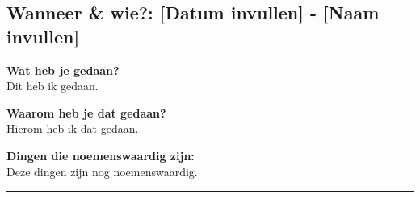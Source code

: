 
\subsection*{Wanneer \& wie?: [Datum invullen] - [Naam invullen]}

\textbf{Wat heb je gedaan?}\\
Dit heb ik gedaan.
\vspace{0.3cm} 

\noindent \textbf{Waarom heb je dat gedaan?}\\
Hierom heb ik dat gedaan.

\noindent \textbf{Dingen die noemenswaardig zijn:}\\
Deze dingen zijn nog noemenswaardig.


\vspace{0.5cm}
\hrule 
\vspace{0.5cm}
